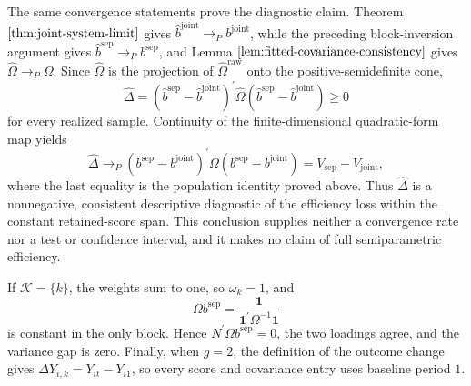 The same convergence statements prove the diagnostic claim. Theorem \(\ref{thm:joint-system-limit}\) gives \(\widehat b^{\mathrm{joint}}\to_Pb^{\mathrm{joint}}\), while the preceding block-inversion argument gives \(\widehat b^{\mathrm{sep}}\to_Pb^{\mathrm{sep}}\), and Lemma \(\ref{lem:fitted-covariance-consistency}\) gives \(\widehat\Omega\to_P\Omega\). Since \(\widehat\Omega\) is the projection of \(\widehat\Omega^{\mathrm{raw}}\) onto the positive-semidefinite cone,
\[
\widehat\Delta
=(\widehat b^{\mathrm{sep}}-\widehat b^{\mathrm{joint}})^{\prime}
  \widehat\Omega
  (\widehat b^{\mathrm{sep}}-\widehat b^{\mathrm{joint}})
\ge0
\]
for every realized sample. Continuity of the finite-dimensional quadratic-form map yields
\[
\widehat\Delta
\to_P
(b^{\mathrm{sep}}-b^{\mathrm{joint}})^{\prime}
 \Omega
 (b^{\mathrm{sep}}-b^{\mathrm{joint}})
=V_{\mathrm{sep}}-V_{\mathrm{joint}},
\]
where the last equality is the population identity proved above. Thus \(\widehat\Delta\) is a nonnegative, consistent descriptive diagnostic of the efficiency loss within the constant retained-score span. This conclusion supplies neither a convergence rate nor a test or confidence interval, and it makes no claim of full semiparametric efficiency.

If \(\mathcal K=\{k\}\), the weights sum to one, so \(\omega_k=1\), and
\[
\Omega b^{\mathrm{sep}}
=\frac{\mathbf 1}{\mathbf 1^{\prime}\Omega^{-1}\mathbf 1}
\]
is constant in the only block. Hence \(N^{\prime}\Omega b^{\mathrm{sep}}=0\), the two loadings agree, and the variance gap is zero. Finally, when \(g=2\), the definition of the outcome change gives \(\Delta Y_{i,k}=Y_{it}-Y_{i1}\), so every score and covariance entry uses baseline period \(1\).